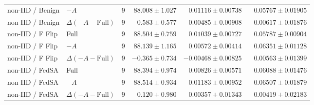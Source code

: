 \begin{table}[t]
\begin{tabular}{llrrrr}
non-IID / Benign & $-A$ & 9 & $88.008 \pm 1.027$ & $0.01116 \pm 0.00738$ & $0.05767 \pm 0.01905$ \\
non-IID / Benign & $\Delta(-A-\mathrm{Full})$ & 9 & $-0.583 \pm 0.577$ & $0.00485 \pm 0.00908$ & $-0.00617 \pm 0.01876$ \\
non-IID / F Flip & Full & 9 & $88.504 \pm 0.759$ & $0.01039 \pm 0.00727$ & $0.05787 \pm 0.00904$ \\
non-IID / F Flip & $-A$ & 9 & $88.139 \pm 1.165$ & $0.00572 \pm 0.00414$ & $0.06351 \pm 0.01128$ \\
non-IID / F Flip & $\Delta(-A-\mathrm{Full})$ & 9 & $-0.365 \pm 0.734$ & $-0.00468 \pm 0.00825$ & $0.00563 \pm 0.01399$ \\
non-IID / FedSA & Full & 9 & $88.394 \pm 0.974$ & $0.00826 \pm 0.00571$ & $0.06088 \pm 0.01476$ \\
non-IID / FedSA & $-A$ & 9 & $88.514 \pm 0.934$ & $0.01183 \pm 0.00952$ & $0.06507 \pm 0.01879$ \\
non-IID / FedSA & $\Delta(-A-\mathrm{Full})$ & 9 & $0.120 \pm 0.980$ & $0.00357 \pm 0.01343$ & $0.00419 \pm 0.02183$ \\
\bottomrule
\end{tabular}
\end{table}


